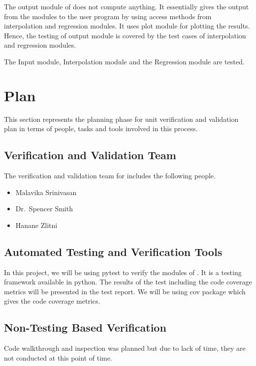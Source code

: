 \documentclass[12pt, titlepage]{article}
\begin{document}
The output module of \famname{} does not compute anything. It essentially gives 
the output from the modules to the user program by using access methods from 
interpolation and regression modules. It uses plot module for plotting the 
results. Hence, the testing of output module is covered by the test cases of 
interpolation and regression modules.

The Input module, Interpolation module and the Regression module are tested.


\section{Plan}

This section represents the planning phase for unit verification and validation 
plan in terms of people, tasks and tools involved in this process.
	
\subsection{Verification and Validation Team}

The verification and validation team for \famname{} includes the following 
people.
\begin{itemize}
	\item Malavika Srinivasan 
	\item Dr.\ Spencer Smith 
	\item Hanane Zlitni
\end{itemize}

\subsection{Automated Testing and Verification Tools}

In this project, we will be using pytest to verify the modules of \famname{}. 
It is a testing framework available in python. The results of the test 
including the code coverage metrics will be presented in the test report. We 
will be using cov package which gives the code coverage metrics.

\subsection{Non-Testing Based Verification}

Code walkthrough and inspection was planned but due to lack of time, they are 
not conducted at this point of time.
\end{document}
